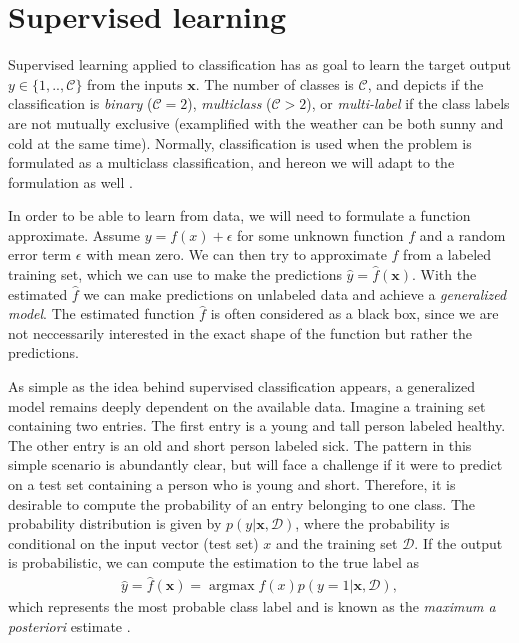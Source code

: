 
\section{Supervised learning}

Supervised learning applied to classification has as goal to learn the target output $y \in \{1,..,\mathcal{C}\}$ from the inputs $\textbf{x}$. The number of classes is $\mathcal{C}$, and depicts if the classification is \textit{binary} ($\mathcal{C}=2$), \textit{multiclass} ($\mathcal{C}>2$), or \textit{multi-label} if the class labels are not mutually exclusive (examplified with the weather can be both sunny and cold at the same time). Normally, classification is used when the problem is formulated as a multiclass classification, and hereon we will adapt to the formulation as well \cite{Murphy2012}.

In order to be able to learn from data, we will need to formulate a function approximate. Assume $y = f(x) + \epsilon$ for some unknown function $f$ and a random error term $\epsilon$ with mean zero. We can then try to approximate $f$ from a labeled training set, which we can use to make the predictions $\hat{y}=\hat{f}(\textbf{x})$. With the estimated $\hat{f}$ we can make predictions on unlabeled data and achieve a \textit{generalized model}. The estimated function $\hat{f}$ is often considered as a black box, since we are not neccessarily interested in the exact shape of the function but rather the predictions.

As simple as the idea behind supervised classification appears, a generalized model remains deeply dependent on the available data. Imagine a training set containing two entries. The first entry is a young and tall person labeled healthy. The other entry is an old and short person labeled sick. The pattern in this simple scenario is abundantly clear, but will face a challenge if it were to predict on a test set containing a person who is young and short. Therefore, it is desirable to compute the probability of an entry belonging to one class. The probability distribution is given by $p(y|\textbf{x}, \mathcal{D})$, where the probability is conditional on the input vector (test set) $x$ and the training set $\mathcal{D}$. If the output is probabilistic, we can compute the estimation to the true label as
\begin{align}
  \hat{y} = \hat{f}(\textbf{x}) = \operatorname*{argmax} f(x) p(y = 1|\textbf{x}, \mathcal{D}),
\end{align}
which represents the most probable class label and is known as the \textit{maximum a posteriori} estimate \cite{Murphy2012}.

